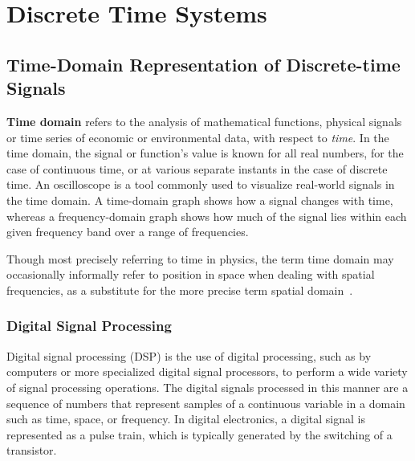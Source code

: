 \documentclass[\documentfontsize, twocolumn]{\classname}
\begin{document}

\setstretch{\spacingvalue}
\setlength{\emergencystretch}{0pt}
\hfuzz=0pt
\setlength{\headsep}{\headsepvalue}
\setlength{\footskip}{\footskipvalue}
\setlength{\marginparsep}{\marginparsepvalue}
\setlength{\marginparwidth}{\marginparwidthvalue}

\tableofcontents

%

\part{Discrete Time Systems}

\chapter{Time-Domain Representation of Discrete-time Signals}

\textbf{Time domain} refers to the analysis of mathematical functions, physical
signals or time series of economic or environmental data, with respect to
\emph{time}. In the time domain, the signal or function's value is known for
all real numbers, for the case of continuous time, or at various separate
instants in the case of discrete time. An oscilloscope is a tool commonly used
to visualize real-world signals in the time domain. A time-domain graph shows
how a signal changes with time, whereas a fre\-quen\-cy-do\-ma\-in graph shows
how much of the signal lies within each given frequency band over a range of
frequencies.

Though most precisely referring to time in physics, the term time domain may
occasionally informally refer to position in space when dealing with spatial
frequencies, as a substitute for the more precise term spatial domain~\cite{bib:wikiTimeDomain}.

\section{Digital Signal Processing}
Digital signal processing (DSP) is the use of digital processing, such as by computers or more specialized digital signal processors, to perform a wide variety of signal processing operations. The digital signals processed in this manner are a sequence of numbers that represent samples of a continuous variable in a domain such as time, space, or frequency. In digital electronics, a digital signal is represented as a pulse train, which is typically generated by the switching of a transistor.
\end{document}

